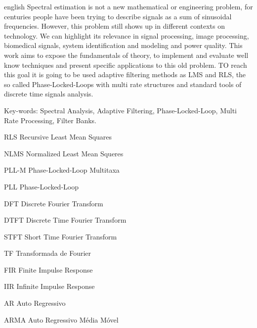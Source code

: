 \documentclass[
12pt,
openany, %
oneside, %
a4paper,			
english,			
brazil			        %
]{abntbibufjf}
\begin{document}
\begin{resumo}[ABSTRACT]
	\begin{otherlanguage*}{english}
		Spectral estimation is not a new mathematical or engineering problem, for centuries people have been trying to describe signals as a sum of sinusoidal frequencies.  However, this problem still shows up in different contexts on technology. We can highlight its relevance in signal processing, image processing, biomedical signals, system identification and modeling and power quality. This work aims to expose the fundamentals of theory, to implement and evaluate well know techniques and present specific applications to this old problem. TO reach this goal it is going to be used adaptive filtering methods as LMS and RLS, the so called Phase-Locked-Loops with multi rate structures and standard tools of discrete time signals analysis.  
		
		Key-words: Spectral Analysis, Adaptive Filtering, Phase-Locked-Loop, Multi Rate Processing, Filter Banks.
		
	\end{otherlanguage*}
\end{resumo}


\listoffigures*
\cleardoublepage


\listoftables*
\cleardoublepage

\begin{siglas} %
	\item[RLS] Recursive Least Mean Squares
	\item[NLMS] Normalized Least Mean Squeres
	\item[PLL-M] Phase-Locked-Loop Multitaxa
	\item[PLL] Phase-Locked-Loop 
	\item[DFT] Discrete Fourier Transform
	\item[DTFT] Discrete Time Fourier Transform
	\item[STFT] Short Time Fourier Transform
	\item[TF] Transformada de Fourier
	\item[FIR] Finite Impulse Response
	\item[IIR] Infinite Impulse Response
	\item[AR]  Auto Regressivo
	\item[ARMA] Auto Regressivo Média Móvel 
	
\end{siglas}
\end{document}
